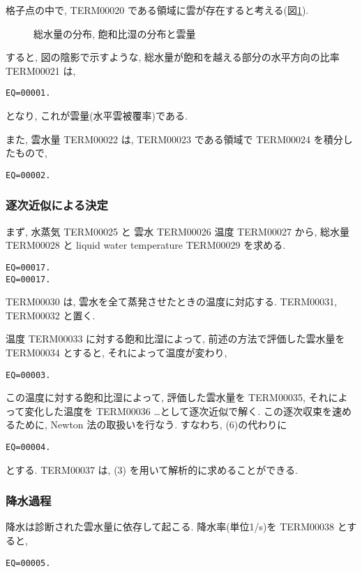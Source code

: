 格子点の中で,
TERM00020 である領域に雲が存在すると考える(図\ref{lsc:fig-cloud}).

\begin{figure}[hbtp]
  \begin{center}
  \end{center}
  \caption{総水量の分布, 飽和比湿の分布と雲量}
  \label{lsc:fig-cloud}
\end{figure}


すると, 図の陰影で示すような,
総水量が飽和を越える部分の水平方向の比率 TERM00021 は,
\begin{verbatim}
EQ=00001.
\end{verbatim}
となり, これが雲量(水平雲被覆率)である.

また, 雲水量 TERM00022 は, TERM00023 である領域で
TERM00024 を積分したもので,
\begin{verbatim}
EQ=00002.
\end{verbatim}

\subsubsection{逐次近似による決定}

まず, 水蒸気 TERM00025 と 雲水 TERM00026 温度 TERM00027 から,
総水量 TERM00028 と liquid water temperature TERM00029 を求める.
\begin{verbatim}
EQ=00017.
EQ=00017.
\end{verbatim}
TERM00030 は, 雲水を全て蒸発させたときの温度に対応する.
TERM00031, TERM00032 と置く.

温度 TERM00033 に対する飽和比湿によって, 
前述の方法で評価した雲水量を TERM00034 とすると,
それによって温度が変わり,
\begin{verbatim}
EQ=00003.
\end{verbatim}
この温度に対する飽和比湿によって, 評価した雲水量を TERM00035,
それによって変化した温度を TERM00036 \ldots として逐次近似で解く.
この逐次収束を速めるために, Newton 法の取扱いを行なう.
すなわち, (6)の代わりに
\begin{verbatim}
EQ=00004.
\end{verbatim}
とする.
TERM00037 は, (3) を用いて解析的に求めることができる.

\subsubsection{降水過程}

降水は診断された雲水量に依存して起こる.
降水率(単位1/s)を TERM00038 とすると,
\begin{verbatim}
EQ=00005.
\end{verbatim}

